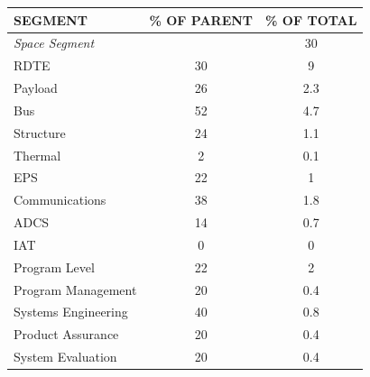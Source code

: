 \begin{table}[htbp]
	\centering

\begin{tabular}{p{10cm} | c | c }

   \textbf{SEGMENT} & \textbf{\% OF PARENT} & \textbf{\% OF TOTAL} \\ \hline \hline

\textsl{Space Segment} &          &       30   \\ \hline

      \hspace{1.0cm}RDTE &         30 &   9       \\ \hline

   \hspace{2.0cm}Payload &         26 &     2.3     \\

       \hspace{2.0cm}Bus &         52 &     4.7    \\ \hline

 \hspace{2.5cm}Structure &         24&      1.1    \\

  \hspace{2.5cm}Thermal &         2 &       0.1   \\

      \hspace{2.5cm}EPS &         22 &      1    \\

\hspace{2.5cm}Communications &         38 &      1.8    \\

      \hspace{2.5cm}ADCS &         14 &     0.7     \\ \hline

       \hspace{2.0cm}IAT &         0 &         0 \\

 \hspace{2.0cm}Program Level &         22 &       2   \\ \hline
 \hspace{2.5cm}Program Management &         20 &      0.4    \\
 \hspace{2.5cm}Systems Engineering &         40 &     0.8     \\
 \hspace{2.5cm}Product Assurance &         20 &       0.4   \\
 \hspace{2.5cm}System Evaluation &         20 &       0.4   \\ \hline


\end{tabular}
\end{table}
